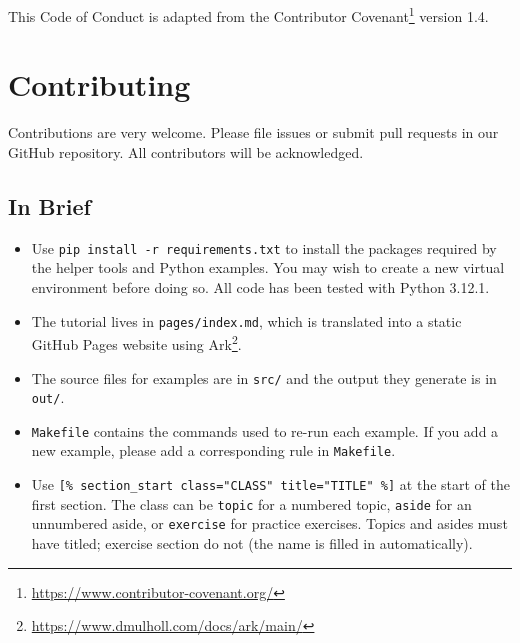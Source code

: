 \documentclass[krantzl]{krantz}
\newcommand{\hreffoot}[2]{{#1}\footnote{\href{#2}{#2}}}
\begin{document}
This Code of Conduct is adapted from the \hreffoot{Contributor Covenant}{https://www.contributor-covenant.org/}
version 1.4.

\chapter{Contributing}\label{contrib}




Contributions are very welcome.
Please file issues or submit pull requests in our GitHub repository.
All contributors will be acknowledged.

\section{In Brief}
\begin{itemize}
\item 

Use \texttt{pip install -r requirements.txt}
    to install the packages required by the helper tools and Python examples.
    You may wish to create a new virtual environment before doing so.
    All code has been tested with Python 3.12.1.



\item 

The tutorial lives in \texttt{pages/index.md},
    which is translated into a static GitHub Pages website using \hreffoot{Ark}{https://www.dmulholl.com/docs/ark/main/}.



\item 

The source files for examples are in \texttt{src/} and the output they generate is in \texttt{out/}.



\item 

\texttt{Makefile} contains the commands used to re-run each example.
    If you add a new example,
    please add a corresponding rule in \texttt{Makefile}.



\item 

Use \texttt{[\% section\_start class="CLASS" title="TITLE" \%]}
    at the start of the first section.
    The class can be \texttt{topic} for a numbered topic,
    \texttt{aside} for an unnumbered aside,
    or \texttt{exercise} for practice exercises.
    Topics and asides must have titled;
    exercise section do not (the name is filled in automatically).




\end{itemize}
\end{document}
